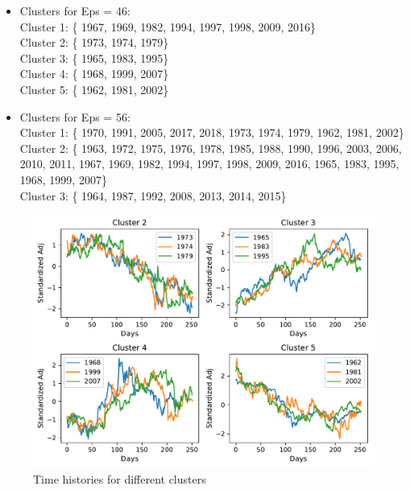 \documentclass[a4paper,11pt,final]{article}
\begin{document}
\begin{itemize}


\item Clusters for Eps = 46: \\ 
Cluster 1:
\{ 1967, 1969, 1982, 1994, 1997, 1998, 2009, 2016\} 
 \\ Cluster 2:
\{ 1973, 1974, 1979\} 
 \\ Cluster 3:
\{ 1965, 1983, 1995\} 
 \\ Cluster 4:
\{ 1968, 1999, 2007\} 
 \\ Cluster 5:
\{ 1962, 1981, 2002\} 
 \\ \item Clusters for Eps = 56: \\ 
Cluster 1:
\{ 1970, 1991, 2005, 2017, 2018, 1973, 1974, 1979, 1962, 1981, 2002\} 
 \\ Cluster 2:
\{ 1963, 1972, 1975, 1976, 1978, 1985, 1988, 1990, 1996, 2003, 2006, 2010, 2011, 1967, 1969, 1982, 1994, 1997, 1998, 2009, 2016, 1965, 1983, 1995, 1968, 1999, 2007\} 
 \\ Cluster 3:
\{ 1964, 1987, 1992, 2008, 2013, 2014, 2015\} 
 \\ 

\end{itemize}


\begin{figure}[htpb]
\center
\includegraphics[width= \linewidth]{figures/report_figure12_1.pdf}
\caption{Time histories for different clusters}
\label{fig:None}
\end{figure}
\end{document}
